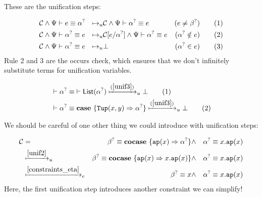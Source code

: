 \documentclass[twoside,12pt,a4paper]{article}
\begin{document}
These are the unification steps: 
\begin{definition}[Unification]
    \begin{align*}
        &\constraints \wedge \Psi \vdash e \equiv\alphaunifvar
        &\mapsto_u& \constraints \wedge \Psi \vdash \alphaunifvar \equiv e &(e\neq \betaunifvar)
        \tag{1}\label{unif1}\\
        &\constraints \wedge \Psi \vdash \alphaunifvar \equiv e 
        &\mapsto_u& \constraints[e/\alphaunifvar] \wedge \Psi \vdash \alphaunifvar \equiv e &(\alphaunifvar \notin e)%
        \tag{2}\label{unif2}\\
        &\constraints \wedge \Psi \vdash \alphaunifvar \equiv e
        &\mapsto_u& \bot &(\alphaunifvar\in e) %
        \tag{3}\label{unif3}    
    \end{align*}
Rule 2 and 3 are the occurs check, which ensures that we don't infinitely substitute terms for unification variables.
\end{definition}

\begin{example}
    \begin{align*}
        &\vdash\alpha^? \equiv \; \vdash \mathsf{List(}\alpha^?\mathsf{)} \xmapsto{(\ref{unif3})}_u \bot\tag{1}\\
        &\vdash\alpha^? \equiv \textbf{case}\ \{\mathtt{Tup(}x, y\mathtt{)}\Rightarrow \alpha^?\}\xmapsto{(\ref{unif3})}_u \bot\tag{2}
    \end{align*}
\end{example}

\iffalse
\begin{example}[Failing the meta-variable occurs check]
    \begin{align*}
        \constraints &= \alphaunifvar \equiv \mathtt{5}\wedge \alphaunifvar \equiv \excopatmatch{\mathtt{hd\Rightarrow 5, tl\Rightarrow 7}}\xmapsto{\cref{unif5}}_u\bot
    \end{align*}
\end{example}
\fi

We should be careful of one other thing we could introduce with unification steps:
\begin{example}
    \begin{align*}
        \mathcal{C} &=& \beta^? \equiv \textbf{cocase}\ \{\texttt{ap}(x)\Rightarrow\alpha^?\}
        &\wedge& \alpha^? \equiv x.\texttt{ap}(x)\\
        &\xmapsto{\ref{unif2}}_u& \beta^?\equiv \textbf{cocase}\ \{\texttt{ap}(x)\Rightarrow x.\texttt{ap}(x)\}
        &\wedge& \alpha^? \equiv x.\texttt{ap}(x)\\
        &\xmapsto{\ref{constraints_eta}}_e& \beta^?\equiv x 
        &\wedge& \alpha^? \equiv x.\texttt{ap}(x)
    \end{align*}
    Here, the first unification step introduces another constraint we can simplify! 
\end{example}
\end{document}
